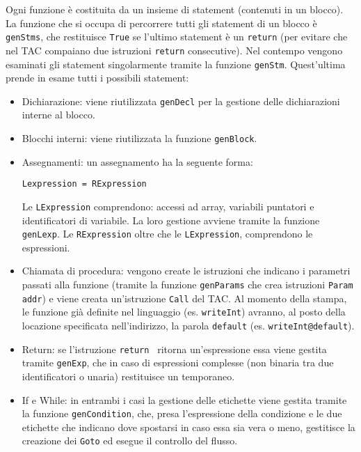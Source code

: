 
Ogni funzione è costituita da un insieme di statement (contenuti in un blocco). La funzione che si occupa di percorrere tutti gli statement di un blocco è {\tt genStms}, che restituisce {\tt True} se l'ultimo statement è un {\tt return} (per evitare che nel TAC compaiano due istruzioni {\tt return} consecutive). Nel contempo vengono esaminati gli statement singolarmente tramite la funzione {\tt genStm}.
Quest'ultima prende in esame tutti i possibili statement:
\begin{itemize}
    \item Dichiarazione: viene riutilizzata {\tt genDecl} per la gestione delle dichiarazioni interne al blocco.
    \item Blocchi interni: viene riutilizzata la funzione {\tt genBlock}.
    \item Assegnamenti: un assegnamento ha la seguente forma:
    \begin{center}
        {\tt Lexpression = RExpression}
    \end{center}
    Le {\tt LExpression} comprendono: accessi ad array, variabili puntatori e identificatori di variabile. La loro gestione avviene tramite la funzione {\tt genLexp}. Le {\tt RExpression} oltre che le {\tt LExpression}, comprendono le espressioni.
    \item Chiamata di procedura: vengono create le istruzioni che indicano i parametri passati alla funzione (tramite la funzione {\tt genParams} che crea istruzioni {\tt Param addr}) e viene creata un'istruzione {\tt Call} del TAC. Al momento della stampa, le funzione già definite nel linguaggio (es. {\tt writeInt}) avranno, al posto della locazione specificata nell'indirizzo, la parola {\tt default} (es. {\tt writeInt@default}).
    \item Return: se l'istruzione {\tt return } ritorna un'espressione essa viene gestita tramite {\tt genExp}, che in caso di espressioni complesse (non binaria tra due identificatori o unaria) restituisce un temporaneo.
    \item If e While: in entrambi i casi la gestione delle etichette viene gestita tramite la funzione {\tt genCondition}, che, presa l'espressione della condizione e le due etichette che indicano dove spostarsi in caso essa sia vera o meno, gestitisce la creazione dei {\tt Goto} ed esegue il controllo del flusso.
\end{itemize}



